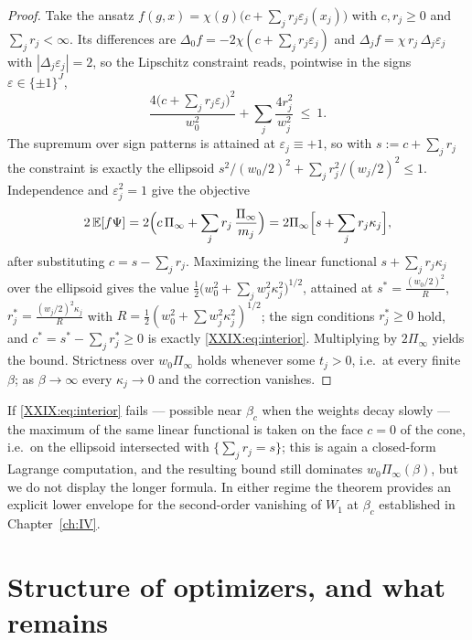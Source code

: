 \begin{proof}
Take the ansatz $f(g,x)=\chi(g)\bigl(c+\sum_jr_j\varepsilon_j(x_j)\bigr)$ with
$c,r_j\ge0$ and $\sum_jr_j<\infty$. Its differences are
$\Delta_0f=-2\chi(c+\sum_jr_j\varepsilon_j)$ and
$\Delta_jf=\chi\,r_j\,\Delta_j\varepsilon_j$ with $|\Delta_j\varepsilon_j|=2$, so the
Lipschitz constraint reads, pointwise in the signs $\varepsilon\in\{\pm1\}^J$,
\[
\frac{4\bigl(c+\sum_jr_j\varepsilon_j\bigr)^2}{w_0^2}+\sum_j\frac{4r_j^2}{w_j^2}\ \le\ 1 .
\]
The supremum over sign patterns is attained at $\varepsilon_j\equiv+1$, so with
$s:=c+\sum_jr_j$ the constraint is exactly the ellipsoid
$s^2/(w_0/2)^2+\sum_jr_j^2/(w_j/2)^2\le1$. Independence and $\varepsilon_j^2=1$ give the
objective
\[
2\,\mathbb{E}[f\Psi]=2\Bigl(c\,\Pi_\infty+\sum_jr_j\,\frac{\Pi_\infty}{m_j}\Bigr)
=2\Pi_\infty\Bigl[s+\sum_jr_j\kappa_j\Bigr],
\]
after substituting $c=s-\sum_jr_j$. Maximizing the linear functional
$s+\sum_jr_j\kappa_j$ over the ellipsoid gives the value
$\tfrac12\bigl(w_0^2+\sum_jw_j^2\kappa_j^2\bigr)^{1/2}$, attained at
$s^*=\tfrac{(w_0/2)^2}{R}$, $r_j^*=\tfrac{(w_j/2)^2\kappa_j}{R}$ with
$R=\tfrac12(w_0^2+\sum w_j^2\kappa_j^2)^{1/2}$; the sign conditions $r_j^*\ge0$ hold, and
$c^*=s^*-\sum_jr_j^*\ge0$ is exactly \eqref{XXIX:eq:interior}. Multiplying by $2\Pi_\infty$
yields the bound. Strictness over $w_0\Pi_\infty$ holds whenever some $t_j>0$, i.e.\ at
every finite $\beta$; as $\beta\to\infty$ every $\kappa_j\to0$ and the correction vanishes.
\end{proof}

\begin{remark}\label{XXIX:rem:boundary}
If \eqref{XXIX:eq:interior} fails --- possible near $\beta_c$ when the weights decay slowly ---
the maximum of the same linear functional is taken on the face $c=0$ of the cone, i.e.\ on
the ellipsoid intersected with $\{\sum_jr_j=s\}$; this is again a closed-form Lagrange
computation, and the resulting bound still dominates $w_0\Pi_\infty(\beta)$, but we do not
display the longer formula. In either regime the theorem provides an explicit lower
envelope for the second-order vanishing of $W_1$ at $\beta_c$ established in Chapter~\ref{ch:IV}.
\end{remark}

\section{Structure of optimizers, and what remains}\label{XXIX:sec:structure}

